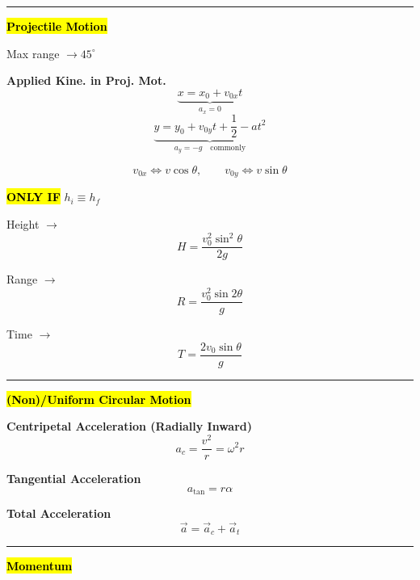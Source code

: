 \documentclass[	DIV=calc,%
							paper=a4,%
							fontsize=11pt,%
							twocolumn]{scrartcl} %
\newcommand{\hformbar}[1]{\vspace{5pt}\hrule\vspace{10pt}} %
\newcommand{\formdesc}[1]{\noindent\textbf{#1}}
\begin{document}
\hformbar{}

\formdesc{\hl{Projectile Motion}}

Max range $\rightarrow 45^\circ\qquad$

\textbf{Applied Kine. in Proj. Mot.}
\begin{equation}
    \underbrace{x=x_0+v_{0x}t}_{a_x=0}
\end{equation}
\begin{equation}
    \underbrace{y=y_0+v_{0y}t+\frac{1}{2}-at^2}_{a_y=-g\quad\text{commonly}}
\end{equation}

\begin{equation}
    v_{0x}\iff v\cos\theta,\qquad v_{0y}\iff v\sin\theta
\end{equation}

\textbf{\hl{ONLY IF}} $h_i\equiv h_f$

Height $\rightarrow$\begin{equation}
    H = \frac{v_0^2\sin^2\theta}{2g}
\end{equation}

Range $\rightarrow$\begin{equation}
     R = \frac{v_0^2\sin{2\theta}}{g}
\end{equation}

Time $\rightarrow$\begin{equation}
    T = \frac{2v_0\sin\theta}{g}
\end{equation}
\hformbar{}

\formdesc{\hl{(Non)/Uniform Circular Motion}}

\textbf{Centripetal Acceleration (Radially Inward)}
\begin{equation}
    a_c=\frac{v^2}{r}=\omega^2r
\end{equation}

\textbf{Tangential Acceleration}
\begin{equation}
    a_{\text{tan}}=r\alpha
\end{equation}

\textbf{Total Acceleration}
\begin{equation}
    \vec{a}=\vec a_c+\vec a_t
\end{equation}
\hformbar{}

\formdesc{\hl{Momentum}}
\end{document}
